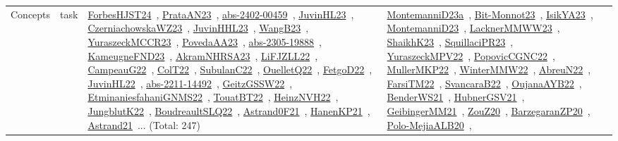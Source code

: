 {\begin{longtable}{lp{3cm}>{\raggedright\arraybackslash}p{6cm}>{\raggedright\arraybackslash}p{6cm}>{\raggedright\arraybackslash}p{8cm}}
Concepts & task & \href{works/ForbesHJST24.pdf}{ForbesHJST24}~\cite{ForbesHJST24}, \href{works/PrataAN23.pdf}{PrataAN23}~\cite{PrataAN23}, \href{works/abs-2402-00459.pdf}{abs-2402-00459}~\cite{abs-2402-00459}, \href{works/JuvinHL23.pdf}{JuvinHL23}~\cite{JuvinHL23}, \href{works/CzerniachowskaWZ23.pdf}{CzerniachowskaWZ23}~\cite{CzerniachowskaWZ23}, \href{works/JuvinHHL23.pdf}{JuvinHHL23}~\cite{JuvinHHL23}, \href{works/WangB23.pdf}{WangB23}~\cite{WangB23}, \href{works/YuraszeckMCCR23.pdf}{YuraszeckMCCR23}~\cite{YuraszeckMCCR23}, \href{works/PovedaAA23.pdf}{PovedaAA23}~\cite{PovedaAA23}, \href{works/abs-2305-19888.pdf}{abs-2305-19888}~\cite{abs-2305-19888}, \href{works/KameugneFND23.pdf}{KameugneFND23}~\cite{KameugneFND23}, \href{works/AkramNHRSA23.pdf}{AkramNHRSA23}~\cite{AkramNHRSA23}, \href{works/LiFJZLL22.pdf}{LiFJZLL22}~\cite{LiFJZLL22}, \href{works/CampeauG22.pdf}{CampeauG22}~\cite{CampeauG22}, \href{works/ColT22.pdf}{ColT22}~\cite{ColT22}, \href{works/SubulanC22.pdf}{SubulanC22}~\cite{SubulanC22}, \href{works/OuelletQ22.pdf}{OuelletQ22}~\cite{OuelletQ22}, \href{works/FetgoD22.pdf}{FetgoD22}~\cite{FetgoD22}, \href{works/JuvinHL22.pdf}{JuvinHL22}~\cite{JuvinHL22}, \href{works/abs-2211-14492.pdf}{abs-2211-14492}~\cite{abs-2211-14492}, \href{works/GeitzGSSW22.pdf}{GeitzGSSW22}~\cite{GeitzGSSW22}, \href{works/EtminaniesfahaniGNMS22.pdf}{EtminaniesfahaniGNMS22}~\cite{EtminaniesfahaniGNMS22}, \href{works/TouatBT22.pdf}{TouatBT22}~\cite{TouatBT22}, \href{works/HeinzNVH22.pdf}{HeinzNVH22}~\cite{HeinzNVH22}, \href{works/JungblutK22.pdf}{JungblutK22}~\cite{JungblutK22}, \href{works/BoudreaultSLQ22.pdf}{BoudreaultSLQ22}~\cite{BoudreaultSLQ22}, \href{works/Astrand0F21.pdf}{Astrand0F21}~\cite{Astrand0F21}, \href{works/HanenKP21.pdf}{HanenKP21}~\cite{HanenKP21}, \href{works/Astrand21.pdf}{Astrand21}~\cite{Astrand21}... (Total: 247) & \href{works/MontemanniD23a.pdf}{MontemanniD23a}~\cite{MontemanniD23a}, \href{works/Bit-Monnot23.pdf}{Bit-Monnot23}~\cite{Bit-Monnot23}, \href{works/IsikYA23.pdf}{IsikYA23}~\cite{IsikYA23}, \href{works/MontemanniD23.pdf}{MontemanniD23}~\cite{MontemanniD23}, \href{works/LacknerMMWW23.pdf}{LacknerMMWW23}~\cite{LacknerMMWW23}, \href{works/ShaikhK23.pdf}{ShaikhK23}~\cite{ShaikhK23}, \href{works/SquillaciPR23.pdf}{SquillaciPR23}~\cite{SquillaciPR23}, \href{works/YuraszeckMPV22.pdf}{YuraszeckMPV22}~\cite{YuraszeckMPV22}, \href{works/PopovicCGNC22.pdf}{PopovicCGNC22}~\cite{PopovicCGNC22}, \href{works/MullerMKP22.pdf}{MullerMKP22}~\cite{MullerMKP22}, \href{works/WinterMMW22.pdf}{WinterMMW22}~\cite{WinterMMW22}, \href{works/AbreuN22.pdf}{AbreuN22}~\cite{AbreuN22}, \href{works/FarsiTM22.pdf}{FarsiTM22}~\cite{FarsiTM22}, \href{works/SvancaraB22.pdf}{SvancaraB22}~\cite{SvancaraB22}, \href{works/OujanaAYB22.pdf}{OujanaAYB22}~\cite{OujanaAYB22}, \href{works/BenderWS21.pdf}{BenderWS21}~\cite{BenderWS21}, \href{works/HubnerGSV21.pdf}{HubnerGSV21}~\cite{HubnerGSV21}, \href{works/GeibingerMM21.pdf}{GeibingerMM21}~\cite{GeibingerMM21}, \href{works/ZouZ20.pdf}{ZouZ20}~\cite{ZouZ20}, \href{works/BarzegaranZP20.pdf}{BarzegaranZP20}~\cite{BarzegaranZP20}, \href{works/Polo-MejiaALB20.pdf}{Polo-MejiaALB20}~\cite{Polo-MejiaALB20}, 
\end{longtable}}
